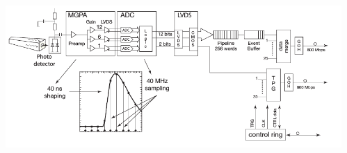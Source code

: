 \documentclass{beamer}
\begin{document}
\begin{frame}
\begin{columns}
\begin{column}{0.73\linewidth}
\begin{tcolorbox}[colback=UNL@Cream!5,colframe=UNL@Cream!70,title=\textcolor{UMN@Maroon}{\textbf{\large{ECAL Properties}}}]
      \end{tcolorbox} 
     \end{column} 
     \begin{column}{0.38\linewidth}
       \begin{tcolorbox}[colback=UNL@Cream!5,colframe=UNL@Cream!70,title=\textcolor{UMN@Maroon}{\textbf{\large{Readout Chain}}}]     
        \includegraphics[height=1.0\textwidth,width=0.95\linewidth]{THESISPLOTS/ReadOut.png}     
       \end{tcolorbox} 
     \end{column}
   \end{columns}
   
 
\end{frame}
\end{document}
